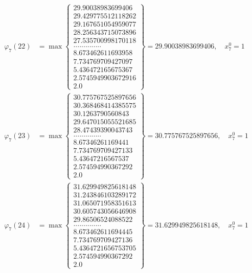 \documentclass{article}
\begin{document}
\begin{align*}
  
  
  
\varphi_{7}(22) &= \max \left\{ \begin{array}{c}
29.90038983699406 \\
 29.429775512118262 \\
 29.167651054959077 \\
 28.256343715073896 \\
 27.535700998170118 \\
 .............. \\
 8.673462611693958 \\
 7.734769709427097 \\
 5.436472165675367 \\
 2.5745949903672916 \\
 2.0
\end{array} \right\} = 29.90038983699406, \quad x_{7}^0 = 1\\
  
  
  
  
\varphi_{7}(23) &= \max \left\{ \begin{array}{c}
30.775767525897656 \\
 30.368468414385575 \\
 30.1263790560843 \\
 29.647015055521685 \\
 28.47439390043743 \\
 .............. \\
 8.67346261169441 \\
 7.734769709427133 \\
 5.43647216567537 \\
 2.574594990367292 \\
 2.0
\end{array} \right\} = 30.775767525897656, \quad x_{7}^0 = 1\\
  
  
  
  
\varphi_{7}(24) &= \max \left\{ \begin{array}{c}
31.629949825618148 \\
 31.243846103289172 \\
 31.065071958351613 \\
 30.605743056646908 \\
 29.86506524088522 \\
 .............. \\
 8.673462611694445 \\
 7.734769709427136 \\
 5.4364721656753705 \\
 2.574594990367292 \\
 2.0
\end{array} \right\} = 31.629949825618148, \quad x_{7}^0 = 1\\
  

\end{align*}
\end{document}
